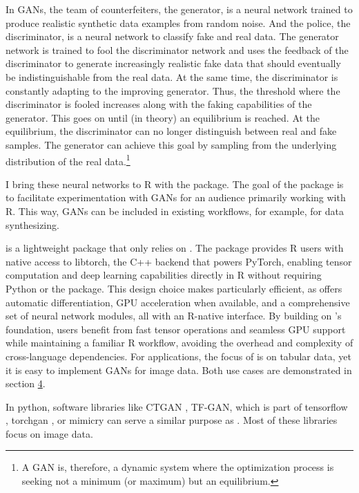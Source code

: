 In GANs, the team of counterfeiters, the generator, is a neural network trained to produce realistic synthetic data examples from random noise. And the police, the discriminator, is a neural network to classify fake and real data. The generator network is trained to fool the discriminator network and uses the feedback of the discriminator to generate increasingly realistic fake data that should eventually be indistinguishable from the real data. At the same time, the discriminator is constantly adapting to the improving generator. Thus, the threshold where the discriminator is fooled increases along with the faking capabilities of the generator. This goes on until (in theory) an equilibrium is reached. At the equilibrium, the discriminator can no longer distinguish between real and fake samples. The generator can achieve this goal by sampling from the underlying distribution of the real data.\footnote{A GAN is, therefore, a dynamic system where the optimization
  process is seeking not a minimum (or maximum) but an equilibrium.}

I bring these neural networks to R with the  package. The goal of the package is to facilitate experimentation with GANs for an audience primarily working with R. This way, GANs can be included in existing workflows, for example, for data synthesizing.

 is a lightweight package that only relies on  \citep{torch}. The  package provides R users with native access to libtorch, the C++ backend that powers PyTorch, enabling tensor computation and deep learning capabilities directly in R without requiring Python or the  \citep{reticulate} package. This design choice makes  particularly efficient, as  offers automatic differentiation, GPU acceleration when available, and a comprehensive set of neural network modules, all with an R-native interface. By building on 's foundation,  users benefit from fast tensor operations and seamless GPU support while maintaining a familiar R workflow, avoiding the overhead and complexity of cross-language dependencies. For applications, the focus of  is on tabular data, yet it is easy to implement GANs for image data. Both use cases are demonstrated in section \hyperref[sec:illustrations]{4}.

In python, software libraries like CTGAN \citep{Xu2019}, TF-GAN, which is part of tensorflow \citep{tensorflow2015-whitepaper}, torchgan \citep{Pal2021}, or mimicry \citep{mimicry} can serve a similar purpose as . Most of these libraries focus on image data.

